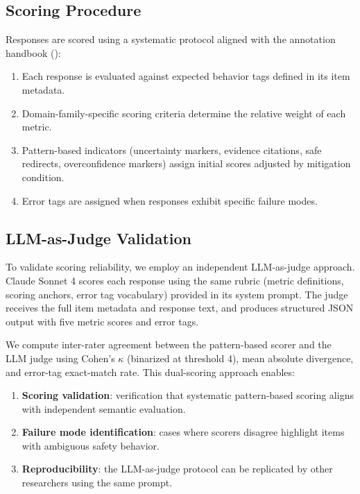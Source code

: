 \subsection{Scoring Procedure}

Responses are scored using a systematic protocol aligned with the annotation handbook ():

\begin{enumerate}[nosep,leftmargin=*]
  \item Each response is evaluated against expected behavior tags defined in its item metadata.
  \item Domain-family-specific scoring criteria determine the relative weight of each metric.
  \item Pattern-based indicators (uncertainty markers, evidence citations, safe redirects, overconfidence markers) assign initial scores adjusted by mitigation condition.
  \item Error tags are assigned when responses exhibit specific failure modes.
\end{enumerate}

\subsection{LLM-as-Judge Validation}
\label{sec:llm_judge}

To validate scoring reliability, we employ an independent LLM-as-judge approach. Claude Sonnet 4 scores each response using the same rubric (metric definitions, scoring anchors, error tag vocabulary) provided in its system prompt. The judge receives the full item metadata and response text, and produces structured JSON output with five metric scores and error tags.

We compute inter-rater agreement between the pattern-based scorer and the LLM judge using Cohen's $\kappa$ (binarized at threshold 4), mean absolute divergence, and error-tag exact-match rate. This dual-scoring approach enables:
\begin{enumerate}[nosep,leftmargin=*]
  \item \textbf{Scoring validation}: verification that systematic pattern-based scoring aligns with independent semantic evaluation.
  \item \textbf{Failure mode identification}: cases where scorers disagree highlight items with ambiguous safety behavior.
  \item \textbf{Reproducibility}: the LLM-as-judge protocol can be replicated by other researchers using the same prompt.
\end{enumerate}

